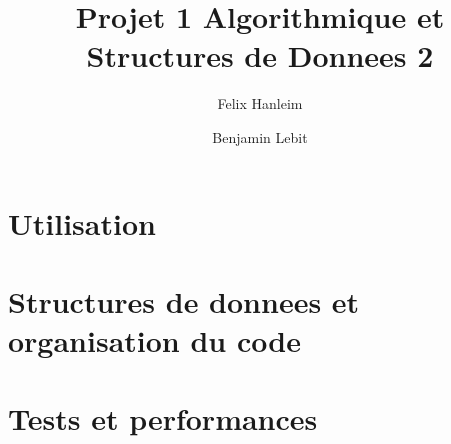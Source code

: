 \documentclass[11pt,english]{article}
\author{
{Felix Hanleim}
\and
{Benjamin Lebit}
}
\title{Projet 1 Algorithmique et Structures de Donnees 2}
\begin{document}
\maketitle
\section{Utilisation}


\section{Structures de donnees et organisation du code}

\section{Tests et performances}
\end{document}
